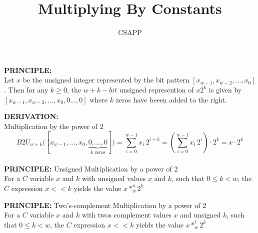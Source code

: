 \documentclass{article}
\title{Multiplying By Constants}
\author{CSAPP}
\begin{document}
    \maketitle

    \begin{flushleft}
        \textbf{\small PRINCIPLE: }\\
        Let $x$ be the unsigned integer represented by the bit pattern
        $[x_{w-1}, x_{w-2}, \ldots, x_0]$. Then for any $k \geq 0$, the $w + k-bit$
        unsigned represention of $x2^k$ is given by $[x_{w-1}, x_{w-2}, \ldots, x_0, 0 \ldots,0]$
        where $k$ zeros have beeen added to the right.
        \smallskip

         \textbf{\small DERIVATION: }\\
         Multiplication by the power of $2$\\
     \[
        B2U_{w+k}\bigl([x_{w-1},\dots,x_0,\underbrace{0,\dots,0}_{k\text{ zeros}}]\bigr)
        = \sum_{i=0}^{w-1} x_i \, 2^{i+k}
        = \left( \sum_{i=0}^{w-1} x_i \, 2^i \right) \cdot 2^k
        = x \cdot 2^k
    \]
    \\
        \textbf{\small PRINCIPLE: } Unsigned Multiplication by a power of $2$\\
        For a $C$ variable $x$ and $k$ with unsigned values $x$ and $k$, such that 
        $0 \leq k < w$, the $C$ expression $x << k$ yields the value $x \ast ^u_w 2^k$

        \smallskip
        \textbf{\small PRINCIPLE: } Two's-complement Multiplication by a power of $2$\\
        For a $C$ variable $x$ and $k$ with twos complement values $x$ and unsigned $k$, such that 
        $0 \leq k < w$, the $C$ expression $x << k$ yields the value $x \ast ^t_w 2^k$
        
    \end{flushleft}
\end{document}
